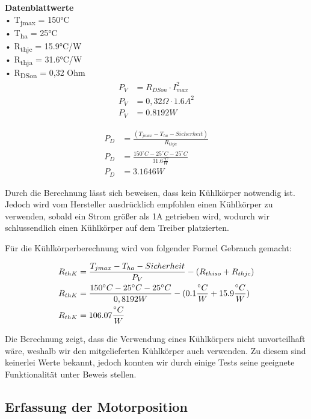 \textbf{Datenblattwerte}\\
• T\textsubscript{jmax} = 150°C \\
• T\textsubscript{ha} = 25°C \\
• R\textsubscript{thjc} = 15.9°C/W \\
• R\textsubscript{thja} = 31.6°C/W \\
• R\textsubscript{DSon} = 0,32 Ohm \\

\begin{align*}
    P_V &= R_{DSon} \cdot I_{max}^2 \\
    P_V &= 0,32\Omega \cdot 1.6A^2 \\
    P_V &= 0.8192W
\end{align*}

\begin{align*}
    P_D &= \frac{(T_{jmax} - T_{ha} - Sicherheit)}{R_{thja}} \\
    P_D &= \frac{150^{\circ}C - 25^{\circ}C - 25^{\circ}C}{31.6\frac{{}^{\circ}C}{W}} \\
    P_D &= 3.1646W
\end{align*}

Durch die Berechnung lässt sich beweisen, dass kein Kühlkörper notwendig ist.
Jedoch wird vom Hersteller ausdrücklich empfohlen einen Kühlkörper zu verwenden, sobald ein Strom größer als 1A getrieben wird, wodurch wir schlussendlich einen Kühlkörper auf dem Treiber platzierten.

Für die Kühlkörperberechnung wird von folgender Formel Gebrauch gemacht:

\begin{align}
    R_{thK} &= \frac{T_{jmax} - T_{ha} - Sicherheit}{P_V} - (R_{thiso} + R_{thjc}) \\
    R_{thK} &= \frac{150^{\circ}C - 25^{\circ}C - 25^{\circ}C}{0,8192W} - (0.1\frac{{}^{\circ}C}{W} + 15.9\frac{{}^{\circ}C}{W}) \notag \\
    R_{thK} &= 106.07\frac{{}^{\circ}C}{W}  \notag
\end{align}

Die Berechnung zeigt, dass die Verwendung eines Kühlkörpers nicht unvorteilhaft wäre, weshalb wir den mitgelieferten Kühlkörper auch verwenden.
Zu diesem sind keinerlei Werte bekannt, jedoch konnten wir durch einige Tests seine geeignete Funktionalität unter Beweis stellen.

\subsection{Erfassung der Motorposition}

